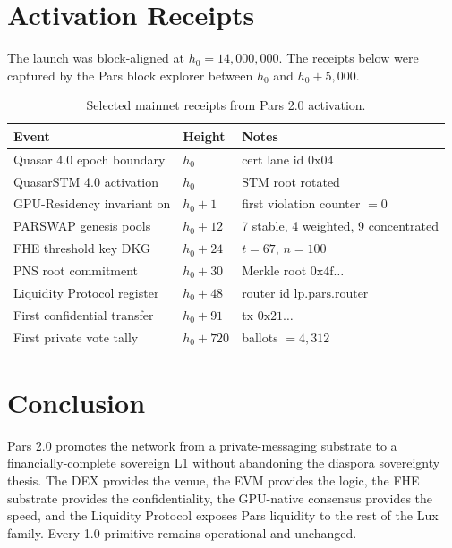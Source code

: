 \documentclass[11pt,a4paper]{article}
\begin{document}
\section{Activation Receipts}
\label{sec:receipts}

The launch was block-aligned at $h_0 = 14{,}000{,}000$. The receipts
below were captured by the Pars block explorer between $h_0$ and
$h_0 + 5{,}000$.

\begin{table}[H]
\centering
\small
\begin{tabular}{lll}
\toprule
\textbf{Event} & \textbf{Height} & \textbf{Notes} \\
\midrule
Quasar 4.0 epoch boundary & $h_0$ & cert lane id $0\text{x04}$ \\
QuasarSTM 4.0 activation & $h_0$ & STM root rotated \\
GPU-Residency invariant on & $h_0 + 1$ & first violation counter $= 0$ \\
PARSWAP genesis pools & $h_0 + 12$ & 7 stable, 4 weighted, 9 concentrated \\
FHE threshold key DKG & $h_0 + 24$ & $t = 67$, $n = 100$ \\
PNS root commitment & $h_0 + 30$ & Merkle root $0\text{x4f}\dots$ \\
Liquidity Protocol register & $h_0 + 48$ & router id $\mathrm{lp.pars.router}$ \\
First confidential transfer & $h_0 + 91$ & tx $0\text{x21}\dots$ \\
First private vote tally & $h_0 + 720$ & ballots $= 4{,}312$ \\
\bottomrule
\end{tabular}
\caption{Selected mainnet receipts from Pars 2.0 activation.}
\end{table}

\section{Conclusion}
\label{sec:conclusion}

Pars 2.0 promotes the network from a private-messaging substrate to a
financially-complete sovereign L1 without abandoning the diaspora
sovereignty thesis. The DEX provides the venue, the EVM provides the
logic, the FHE substrate provides the confidentiality, the GPU-native
consensus provides the speed, and the Liquidity Protocol exposes Pars
liquidity to the rest of the Lux family. Every 1.0 primitive remains
operational and unchanged.
\end{document}
